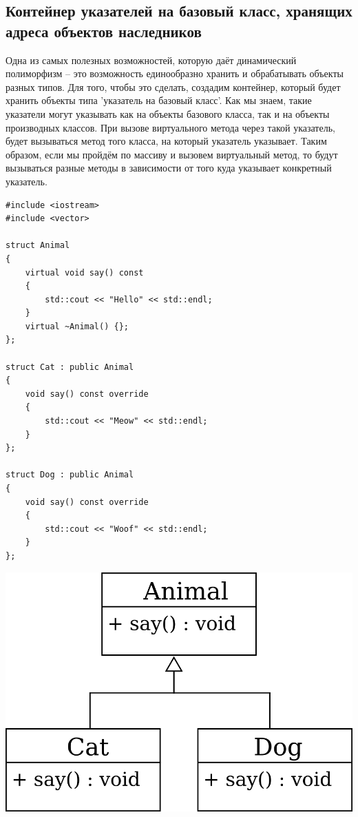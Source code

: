 \documentclass{article}
\begin{document}
\newpage
\subsection*{Контейнер указателей на базовый класс, хранящих адреса объектов наследников}
Одна из самых полезных возможностей, которую даёт динамический полиморфизм -- это возможность единообразно хранить и обрабатывать объекты разных типов. Для того, чтобы это сделать, создадим контейнер, который будет хранить объекты типа 'указатель на базовый класс'. Как мы знаем, такие указатели могут указывать как на объекты базового класса, так и на объекты производных классов. При вызове виртуального метода через такой указатель, будет вызываться метод того класса, на который указатель указывает. Таким образом, если мы пройдём по массиву и вызовем виртуальный метод, то будут вызываться разные методы в зависимости от того куда указывает конкретный указатель.

\begin{minipage}{0.5\textwidth}
\begin{lstlisting}[style=csMiptCppStyle]
#include <iostream>
#include <vector>

struct Animal
{
    virtual void say() const
    {
        std::cout << "Hello" << std::endl;
    }
    virtual ~Animal() {};
};

struct Cat : public Animal
{
    void say() const override
    {
        std::cout << "Meow" << std::endl;
    }
};

struct Dog : public Animal
{
    void say() const override
    {
        std::cout << "Woof" << std::endl;
    }
};
\end{lstlisting}
\end{minipage}
\begin{minipage}{0.5\textwidth}
\begin{center}
\includegraphics[scale=0.9]{../images/animals.png}
\end{center}
\end{minipage}
\end{document}
